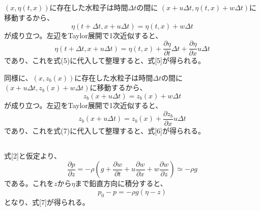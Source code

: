 \documentclass[a4paper]{jsarticle}
\begin{document}
\subsection{}
$(x, \eta(t, x))$に存在した水粒子は時間$\Delta t$の間に
$(x + u \Delta t, \eta(t, x) + w \Delta t)$に移動するから、
\begin{equation}
  \eta(t + \Delta t, x + u \Delta t) = \eta(t, x) + w \Delta t
\end{equation}
が成り立つ。左辺をTaylor展開で1次近似すると、
\begin{equation}
  \eta(t + \Delta t, x + u \Delta t)
  = \eta(t, x) + \frac{\partial \eta}{\partial t} \Delta t
  + \frac{\partial \eta}{\partial x} u \Delta t
\end{equation}
であり、これを式(5)に代入して整理すると、式[5]が得られる。\par
同様に、$(x, z_b(x))$に存在した水粒子は時間$\Delta t$の間に
$(x + u \Delta t, z_b(x) + w \Delta t)$に移動するから、
\begin{equation}
  z_b(x + u \Delta t) = z_b(x) + w \Delta t
\end{equation}
が成り立つ。左辺をTaylor展開で1次近似すると、
\begin{equation}
  z_b(x + u \Delta t)
  = z_b(x) + \frac{\partial z_b}{\partial x} u \Delta t
\end{equation}
であり、これを式(7)に代入して整理すると、式[6]が得られる。

\subsection{}
式[2]と仮定より、
\begin{equation}
  \frac{\partial p}{\partial z}
  = -\rho \left(g + \frac{\partial w}{\partial t}
  + u \frac{\partial w}{\partial x} + w \frac{\partial w}{\partial z}\right)
  \simeq -\rho g
\end{equation}
である。これを$z$から$\eta$まで鉛直方向に積分すると、
\begin{equation}
  p_0 - p = -\rho g (\eta - z)
\end{equation}
となり、式[7]が得られる。
\end{document}
